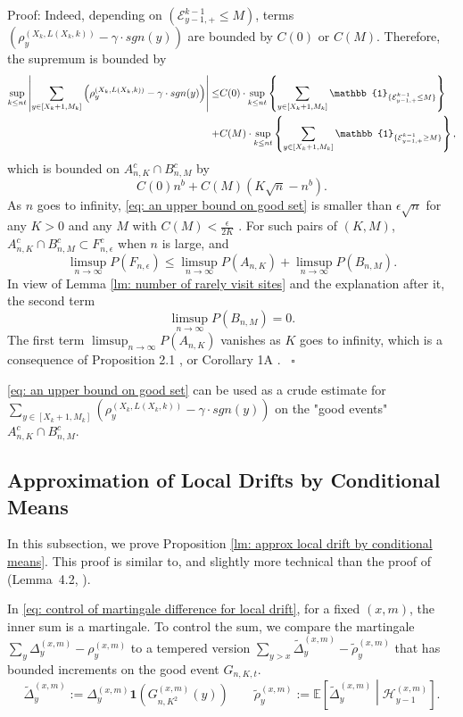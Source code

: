 \documentclass[twoside,12pt,a4paper]{article}
\numberwithin{equation}{section}
\newenvironment{proof}[1][Proof]{{\sc #1}:}{~\hfill $\square$}
\newcommand{\abs}[1]{\left\vert #1 \right\vert}
\begin{document}
\begin{proof}
	Indeed, depending on $(\mathcal{E}^{k-1}_{y-1,+} \leq M)$, terms  $\left( \rho^{(X_k,L(X_k,k))}_y -  \gamma \cdot sgn(y) \right)$ are bounded by $C(0)$ or $C(M)$. Therefore, the supremum is bounded by
	\begin{align*}
	 \sup_{k\leq n t}  \abs{  	\sum_{y\in [X_{k}+1 ,M_k]} \left( \rho^{(X_k,L(X_k,k))}_y -  \gamma \cdot sgn(y) \right) } \leq &  
	 C(0) \cdot \sup_{k\leq n t} \left\{   	\sum_{y\in [X_{k}+1 ,M_k]} \mathbb{1}_{ \{ \mathcal{E}^{k-1}_{y-1,+} \leq M \} } \right\}
	 \notag
	 \\
	 +& C(M) \cdot \sup_{k\leq n t} \left\{   	\sum_{y\in [X_{k}+1 ,M_k]} \mathbb{1}_{ \{ \mathcal{E}^{k-1}_{y-1,+} \geq M \} } \right\},
\end{align*} which is bounded on $A^c_{n,K} \cap B^c_{n,M}$ by
\begin{equation}\label{eq: an upper bound on good set}
	C(0)n^b  + C(M) \left(K \sqrt{n} -n^b\right).
\end{equation} As $n$ goes to infinity, \eqref{eq: an upper bound on good set} is smaller than $\epsilon \sqrt{n}$ for any $K>0$ and any $M$ with $C(M) < \frac{\epsilon}{2K}$ . 
For such pairs of $(K,M)$, $A^c_{n,K} \cap B^c_{n,M} \subset F^c_{n,\epsilon}$ when $n$ is large,  and 
$$
\limsup_{n\to \infty} P(F_{n,\epsilon}) \leq \limsup_{n\to \infty}  P(A_{n,K}) +  \limsup_{n\to \infty}  P(B_{n,M}).
$$ In view of Lemma \ref{lm: number of rarely visit sites} and the explanation after it, the second term $$\limsup_{n\to \infty}  P(B_{n,M})=0.$$  The first term $\limsup_{n\to \infty}  P(A_{n,K}) $ vanishes as $K$ goes to infinity, which is a consequence of Proposition 2.1 \cite{KMP22}, or Corollary 1A \cite{T96}.
\end{proof}

\eqref{eq: an upper bound on good set} can be used as a crude estimate for 	$\sum_{y\in [X_{k}+1 ,M_{k}]} \left( \rho^{(X_k,L(X_k,k))}_y -  \gamma \cdot sgn(y) \right)$   on the "good events" $A^c_{n,K}\cap B^c_{n,M}$.

\subsection{Approximation of Local Drifts by Conditional Means}
In this subsection, we prove Proposition \ref{lm: approx local drift by conditional means}. This proof is similar to, and slightly more technical than the proof of (Lemma~4.2, \cite{KP16}). 

In \eqref{eq: control of martingale difference for local drift}, for a fixed $(x,m)$, the inner sum is a martingale. To control the sum, we compare the martingale $\sum_y \Delta_y^{(x,m)} - \rho_y^{(x,m)}$ to a tempered version $\sum_{y > x} \tilde \Delta_{y}^{(x,m)} - \tilde\rho_y^{(x,m)}$ that has bounded increments on the good event $G_{n, K, t}$.
\[
	\tilde \Delta_y^{(x,m)} := \Delta_y ^{(x,m)} \mathbf{1}\left( G_{n, K^2}^{(x,m)} (y)\right) \qquad
	\tilde \rho_y^{(x,m)} := \mathbb{E}\left[ \tilde\Delta_y^{(x,m)} \middle| \mathcal{H}_{y-1}^{(x,m)} \right]  
.\] 
\end{document}
